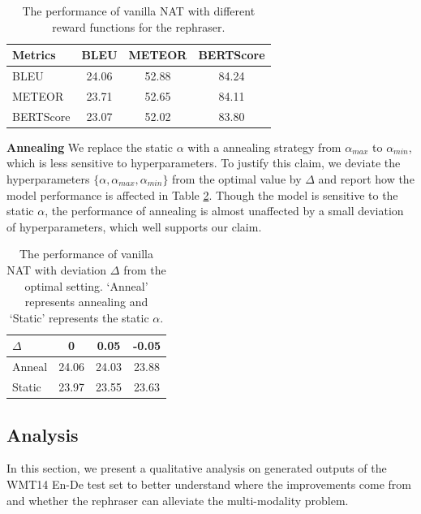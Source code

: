 \documentclass[letterpaper]{article} %
\begin{document}
\begin{table}[t]
\small
\centering
\begin{tabular}{lccc}
\toprule
{\textbf{Metrics}} &BLEU& METEOR & BERTScore\\
\midrule
BLEU&24.06&52.88&84.24\\
METEOR&23.71&52.65&84.11\\
BERTScore&23.07&52.02&83.80\\
\bottomrule
\end{tabular}
\caption{The performance of vanilla NAT with different reward functions for the rephraser.}
\label{tab:reward}
\end{table}

\vspace{5pt}
\noindent{}\textbf{Annealing} We replace the static $\alpha$ with a annealing strategy from $\alpha_{max}$ to $\alpha_{min}$, which is less sensitive to hyperparameters. To justify this claim, we deviate the hyperparameters $\{\alpha,\alpha_{max},\alpha_{min}\}$ from the optimal value by $\Delta$ and report how the model performance is affected in Table \ref{tab:curr}. Though the model is sensitive to the static $\alpha$, the performance of annealing is almost unaffected by a small deviation of hyperparameters, which well supports our claim.
\begin{table}[t]
\small
\centering
\begin{tabular}{lccc}
\toprule
$\Delta$ &0& 0.05 & -0.05\\
\midrule
Anneal&24.06&24.03&23.88\\
Static&23.97&23.55&23.63\\
\bottomrule
\end{tabular}
\caption{The performance of vanilla NAT with deviation $\Delta$ from the optimal setting. `Anneal' represents annealing and `Static' represents the static $\alpha$.}
\label{tab:curr}
\end{table}



\subsection{Analysis}
In this section, we present a qualitative analysis on generated outputs of the WMT14 En-De test set to better understand where the improvements come from and whether the rephraser can alleviate the multi-modality problem.
\end{document}
